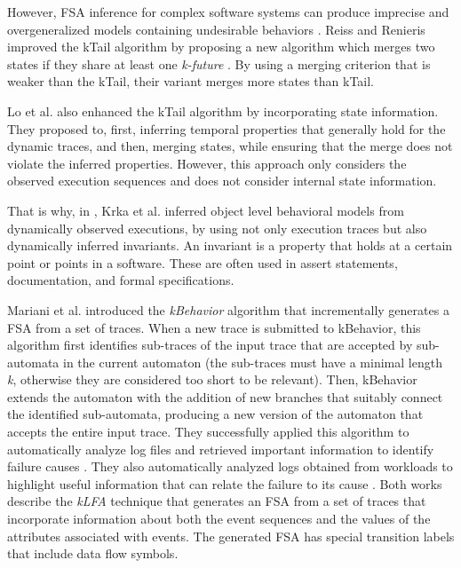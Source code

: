 However, FSA inference for complex software systems can produce
imprecise and overgeneralized models containing undesirable
behaviors \cite{4023976}. Reiss and Renieris improved the kTail
algorithm by proposing a new algorithm which merges two states if
they share at least one \textit{k-future} \cite{919096}. By using
a merging criterion that is weaker than the kTail, their variant
merges more states than kTail.

Lo et al. \cite{Lo:2009:ASB:1595696.1595761} also enhanced the
kTail algorithm by incorporating state information. They
proposed to, first, inferring temporal properties that generally
hold for the dynamic traces, and then, merging states, while
ensuring that the merge does not violate the inferred properties.
However, this approach only considers the observed execution
sequences and does not consider internal state information.

That is why, in \cite{Krka:2010:UDE:1810295.1810324}, Krka et al.
inferred object level behavioral models from dynamically observed
executions, by using not only execution traces but also
dynamically inferred invariants. An invariant is a property that
holds at a certain point or points in a software.  These are
often used in assert statements, documentation, and formal
specifications.

Mariani et al. introduced the \textit{kBehavior} algorithm
\cite{mariani2007dynamic} that incrementally generates a FSA from
a set of traces. When a new trace is submitted to kBehavior, this
algorithm first identifies sub-traces of the input trace that are
accepted by sub-automata in the current automaton (the sub-traces
must have a minimal length \textit{k}, otherwise they are
considered too short to be relevant). Then, kBehavior extends the
automaton with the addition of new branches that suitably connect
the identified sub-automata, producing a new version of the
automaton that accepts the entire input trace. They successfully
applied this algorithm to automatically analyze log files and
retrieved important information to identify failure causes
\cite{4700316}. They also automatically analyzed logs obtained
from workloads to highlight useful information that can relate
the failure to its cause \cite{cotroneo2007investigation}.
Both works describe the \textit{kLFA} technique that generates
an FSA from a set of traces that incorporate information about
both the event sequences and the values of the attributes
associated with events. The generated FSA has special transition
labels that include data flow symbols.

